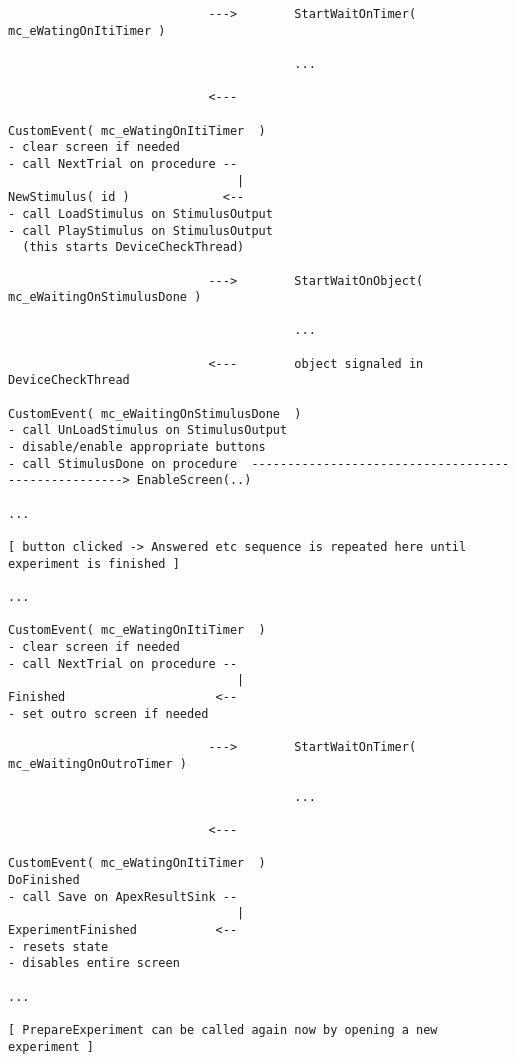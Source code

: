 \documentclass[a4paper,12pt]{article}
\begin{document}
\begin{landscape}
\begin{verbatim}
                            --->        StartWaitOnTimer( mc_eWatingOnItiTimer )
                            
                                        ...
                                        
                            <---
                            
CustomEvent( mc_eWatingOnItiTimer  )
- clear screen if needed
- call NextTrial on procedure --
                                |
NewStimulus( id )             <--
- call LoadStimulus on StimulusOutput
- call PlayStimulus on StimulusOutput
  (this starts DeviceCheckThread)
  
                            --->        StartWaitOnObject( mc_eWaitingOnStimulusDone )
                            
                                        ...
                                        
                            <---        object signaled in DeviceCheckThread
                            
CustomEvent( mc_eWaitingOnStimulusDone  )                            
- call UnLoadStimulus on StimulusOutput
- disable/enable appropriate buttons
- call StimulusDone on procedure  ----------------------------------------------------> EnableScreen(..)

...

[ button clicked -> Answered etc sequence is repeated here until experiment is finished ]

...

CustomEvent( mc_eWatingOnItiTimer  )
- clear screen if needed
- call NextTrial on procedure --
                                |
Finished                     <--
- set outro screen if needed

                            --->        StartWaitOnTimer( mc_eWaitingOnOutroTimer )
                            
                                        ...
                                        
                            <---

CustomEvent( mc_eWatingOnItiTimer  )
DoFinished
- call Save on ApexResultSink --
                                |
ExperimentFinished           <--
- resets state
- disables entire screen

...

[ PrepareExperiment can be called again now by opening a new experiment ]

\end{verbatim}
\end{landscape}
\end{document}
